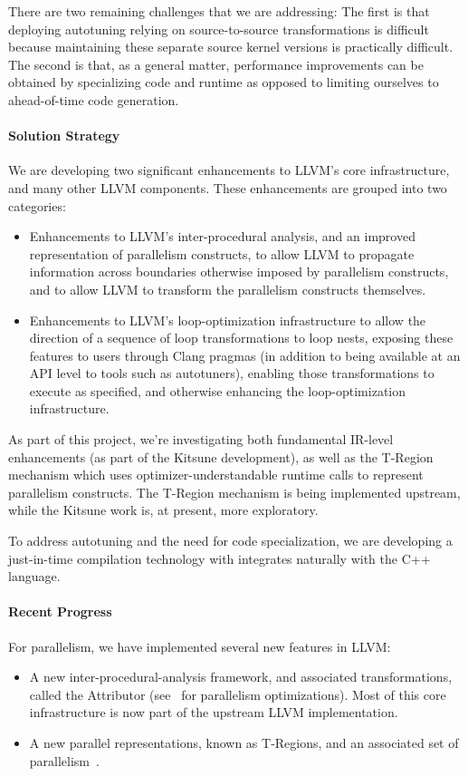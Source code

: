 There are two remaining challenges that we are addressing: The first is that deploying autotuning relying on source-to-source transformations is difficult because maintaining these separate source kernel versions is practically difficult. The second is that, as a general matter, performance improvements can be obtained by specializing code and runtime as opposed to limiting ourselves to ahead-of-time code generation.

\paragraph{Solution Strategy}
We are developing two significant enhancements to LLVM's core infrastructure, and many other LLVM components. These enhancements are grouped into two categories:
\begin{itemize}
\item Enhancements to LLVM's inter-procedural analysis, and an improved representation of parallelism constructs, to allow LLVM to propagate information across boundaries otherwise imposed by parallelism constructs, and to allow LLVM to transform the parallelism constructs themselves.
\item Enhancements to LLVM's loop-optimization infrastructure to allow the direction of a sequence of loop transformations to loop nests, exposing these features to users through Clang pragmas (in addition to being available at an API level to tools such as autotuners), enabling those transformations to execute as specified, and otherwise enhancing the loop-optimization infrastructure.
\end{itemize}

As part of this project, we're investigating both fundamental IR-level enhancements (as part of the Kitsune development), as well as the T-Region mechanism which uses optimizer-understandable runtime calls to represent parallelism constructs. The T-Region mechanism is being implemented upstream, while the Kitsune work is, at present, more exploratory.

To address autotuning and the need for code specialization, we are developing a just-in-time compilation technology with integrates naturally with the C++ language.

\paragraph{Recent Progress}
For parallelism, we have implemented several new features in LLVM:
\begin{itemize}
\item A new inter-procedural-analysis framework, and associated transformations, called the Attributor (see~\cite{doerfert2018compiler} for parallelism optimizations). Most of this core infrastructure is now part of the upstream LLVM implementation.
\item A new parallel representations, known as T-Regions, and an associated set of parallelism~\cite{doerfert2019tregion}.
\end{itemize}

